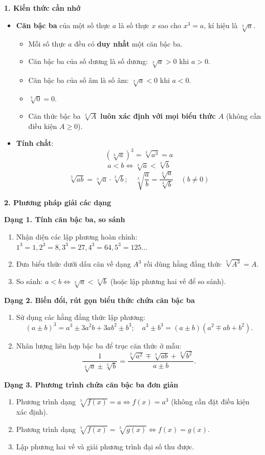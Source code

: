 \textbf{1. Kiến thức cần nhớ}
\begin{itemize}
\item \textbf{Căn bậc ba} của một số thực $a$ là số thực $x$ sao cho $x^3 = a$, kí hiệu là $\sqrt[3]{a}$.
\begin{itemize}
\item Mỗi số thực $a$ đều có \textbf{duy nhất} một căn bậc ba.
\item Căn bậc ba của số dương là số dương: $\sqrt[3]{a} > 0$ khi $a > 0$.
\item Căn bậc ba của số âm là số âm: $\sqrt[3]{a} < 0$ khi $a < 0$.
\item $\sqrt[3]{0} = 0$.
\item Căn thức bậc ba $\sqrt[3]{A}$ \textbf{luôn xác định với mọi biểu thức $A$} (không cần điều kiện $A \ge 0$).
\end{itemize}
\item \textbf{Tính chất}:
$$\boxed{(\sqrt[3]{a})^3 = \sqrt[3]{a^3} = a}$$
$$\boxed{a < b \iff \sqrt[3]{a} < \sqrt[3]{b}}$$
$$\boxed{\sqrt[3]{ab} = \sqrt[3]{a} \cdot \sqrt[3]{b}};\quad \boxed{\sqrt[3]{\dfrac{a}{b}} = \dfrac{\sqrt[3]{a}}{\sqrt[3]{b}}\quad (b \ne 0)}$$
\end{itemize}

\textbf{2. Phương pháp giải các dạng}

\textbf{Dạng 1. Tính căn bậc ba, so sánh}
\begin{enumerate}
\item Nhận diện các lập phương hoàn chỉnh: $1^3 = 1, 2^3 = 8, 3^3 = 27, 4^3 = 64, 5^3 = 125\dots$
\item Đưa biểu thức dưới dấu căn về dạng $A^3$ rồi dùng hằng đẳng thức $\sqrt[3]{A^3} = A$.
\item So sánh: $a < b \iff \sqrt[3]{a} < \sqrt[3]{b}$ (hoặc lập phương hai vế để so sánh).
\end{enumerate}

\textbf{Dạng 2. Biến đổi, rút gọn biểu thức chứa căn bậc ba}
\begin{enumerate}
\item Sử dụng các hằng đẳng thức lập phương:
$$(a \pm b)^3 = a^3 \pm 3a^2b + 3ab^2 \pm b^3;\quad a^3 \pm b^3 = (a \pm b)(a^2 \mp ab + b^2).$$
\item Nhân lượng liên hợp bậc ba để trục căn thức ở mẫu:
$$\dfrac{1}{\sqrt[3]{a} \pm \sqrt[3]{b}} = \dfrac{\sqrt[3]{a^2} \mp \sqrt[3]{ab} + \sqrt[3]{b^2}}{a \pm b}.$$
\end{enumerate}

\textbf{Dạng 3. Phương trình chứa căn bậc ba đơn giản}
\begin{enumerate}
\item Phương trình dạng $\sqrt[3]{f(x)} = a \iff \boxed{f(x) = a^3}$ (không cần đặt điều kiện xác định).
\item Phương trình dạng $\sqrt[3]{f(x)} = \sqrt[3]{g(x)} \iff \boxed{f(x) = g(x)}$.
\item Lập phương hai vế và giải phương trình đại số thu được.
\end{enumerate}
